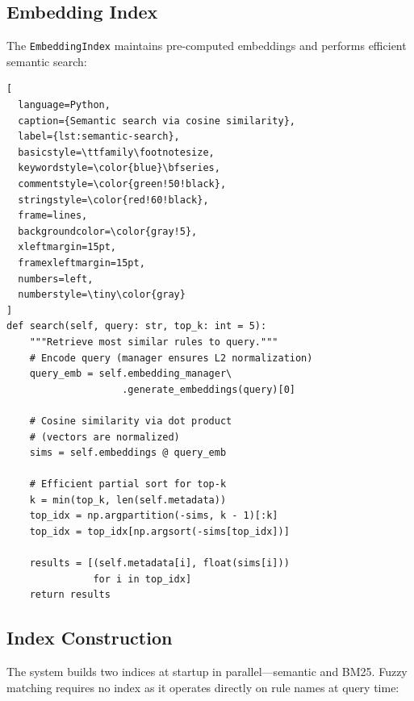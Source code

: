 \subsection{Embedding Index}

The \texttt{EmbeddingIndex} maintains pre-computed embeddings and performs efficient semantic search:

\begin{lstlisting}[
  language=Python, 
  caption={Semantic search via cosine similarity}, 
  label={lst:semantic-search},
  basicstyle=\ttfamily\footnotesize,
  keywordstyle=\color{blue}\bfseries,
  commentstyle=\color{green!50!black},
  stringstyle=\color{red!60!black},
  frame=lines,
  backgroundcolor=\color{gray!5},
  xleftmargin=15pt,
  framexleftmargin=15pt,
  numbers=left,
  numberstyle=\tiny\color{gray}
]
def search(self, query: str, top_k: int = 5):
    """Retrieve most similar rules to query."""
    # Encode query (manager ensures L2 normalization)
    query_emb = self.embedding_manager\
                    .generate_embeddings(query)[0]
    
    # Cosine similarity via dot product 
    # (vectors are normalized)
    sims = self.embeddings @ query_emb
    
    # Efficient partial sort for top-k
    k = min(top_k, len(self.metadata))
    top_idx = np.argpartition(-sims, k - 1)[:k]
    top_idx = top_idx[np.argsort(-sims[top_idx])]
    
    results = [(self.metadata[i], float(sims[i])) 
               for i in top_idx]
    return results
\end{lstlisting}

\subsection{Index Construction}

The system builds two indices at startup in parallel—semantic and BM25. Fuzzy matching requires no index as it operates directly on rule names at query time:

